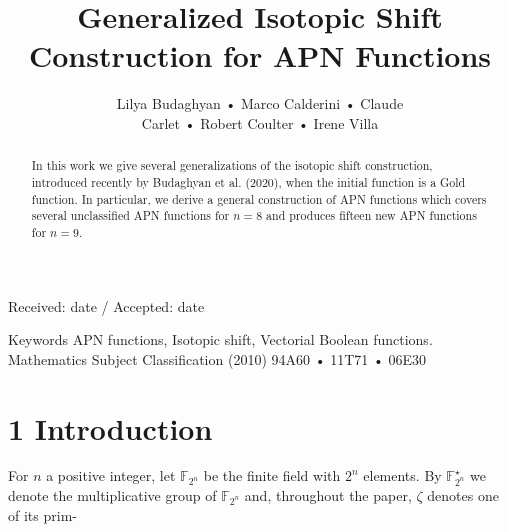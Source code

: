 \documentclass[10pt]{article}
\title{Generalized Isotopic Shift Construction for APN Functions }
\author{Lilya Budaghyan • Marco Calderini • Claude\\
Carlet • Robert Coulter • Irene Villa}
\date{}
\begin{document}
\maketitle
\captionsetup{singlelinecheck=false}
Received: date / Accepted: date

\begin{abstract}
In this work we give several generalizations of the isotopic shift construction, introduced recently by Budaghyan et al. (2020), when the initial function is a Gold function. In particular, we derive a general construction of APN functions which covers several unclassified APN functions for $n=8$ and produces fifteen new APN functions for $n=9$.
\end{abstract}

Keywords APN functions, Isotopic shift, Vectorial Boolean functions.\\
Mathematics Subject Classification (2010) 94A60 • 11T71 • 06E30

\section*{1 Introduction}
For $n$ a positive integer, let $\mathbb{F}_{2^{n}}$ be the finite field with $2^{n}$ elements. By $\mathbb{F}_{2^{n}}^{\star}$ we denote the multiplicative group of $\mathbb{F}_{2^{n}}$ and, throughout the paper, $\zeta$ denotes one of its prim-
\end{document}
